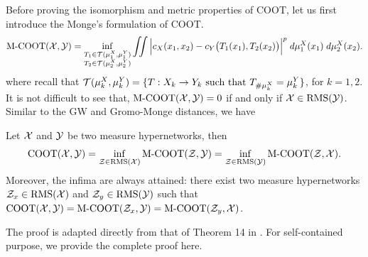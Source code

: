 Before proving the isomorphism and metric properties of COOT, let us first introduce the Monge's
formulation of COOT.
\begin{align}
  \text{M-COOT}(\mathcal X, \mathcal Y) =
  \inf_{\substack{T_1 \in \mathcal T(\mu^X_1, \mu^Y_1) \\ T_2 \in \mathcal T(\mu^X_2, \mu^Y_2)}}
  \iint \Big|c_X(x_1, x_2) - c_Y \big( T_1(x_1), T_2(x_2) \big) \Big|^p
  \; d\mu^X_1(x_1) \; d\mu^X_2(x_2).
\end{align}
where recall that
$\mathcal T(\mu^X_k, \mu^Y_k) = \{T: X_k \to Y_k \text{ such that } T_{\# \mu^X_k} = \mu^Y_k \}$,
for $k=1,2$. It is not difficult to see that, $\text{M-COOT}(\mathcal X, \mathcal Y) = 0$ if and only if
$\mathcal X \in \text{RMS}(\mathcal Y)$. Similar to the GW and Gromo-Monge distances, we have
\begin{corollary} \label{coro:coot_mcoot}
  Let $\mathcal X$ and $\mathcal Y$ be two measure hypernetworks, then
  \begin{equation}
    \text{COOT}(\mathcal X, \mathcal Y) = \inf_{\mathcal Z \in \text{RMS}(\mathcal X)} \text{M-COOT}(\mathcal Z, \mathcal Y)
    = \inf_{\mathcal Z \in \text{RMS}(\mathcal Y)} \text{M-COOT}(\mathcal Z, \mathcal X).
  \end{equation}
  Moreover, the infima are always attained: there exist two measure hypernetworks
  $\mathcal Z_x \in \text{RMS}(\mathcal X)$ and $\mathcal Z_y \in \text{RMS}(\mathcal Y)$ such that
  $\text{COOT}(\mathcal X, \mathcal Y) = \text{M-COOT}(\mathcal Z_x, \mathcal Y) = \text{M-COOT}(\mathcal Z_y, \mathcal X)$.
\end{corollary}
The proof is adapted directly from that of Theorem 14 in \citep{Memoli21}.
For self-contained purpose, we provide the complete proof here.
